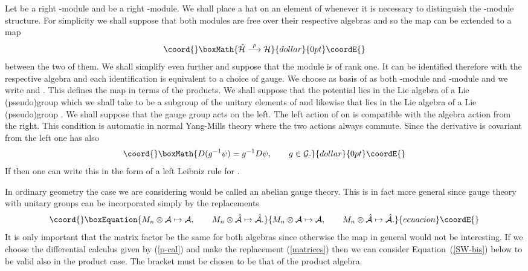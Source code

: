 \documentclass[a4paper,12pt]{article}
\def\h#1{\hat #1}
\def\c#1{{\cal #1}}
\def\wm{\mathbin{*}}
\def\hwm{\mathbin{\hat *}}
\begin{document}
Let \myHighlight{$\c{H}$}\coordHE{} be a right \myHighlight{$\c{A}$}\coordHE{}-module and \myHighlight{$\h{\c{H}}$}\coordHE{} be
a right \myHighlight{$\h{\c}{A}$}\coordHE{}-module.  We shall place a hat on an element of \myHighlight{$\c{H}$}\coordHE{}
whenever it is necessary to distinguish the \myHighlight{$\h{\c}{A}$}\coordHE{}-module structure.
For simplicity we shall suppose that both modules
are free over their respective algebras and so the map \myHighlight{$\rho$}\coordHE{} can be
extended to a map
$$\coord{}\boxMath{
\h{\c{H}} \buildrel \rho \over \longrightarrow \c{H}
}{dollar}{0pt}\coordE{}$$
between the two of them. We shall simplify even further and suppose
that the module is of rank one. It can be identified therefore with
the respective algebra and each identification is equivalent to a
choice of gauge. We choose \myHighlight{$\psi_0 \in \c{H}$}\coordHE{} as basis of \myHighlight{$\c{H}$}\coordHE{}
as both \myHighlight{$\c{A}$}\coordHE{}-module and \myHighlight{$\h{\c}{A}$}\coordHE{}-module and we write
\myHighlight{$\psi = \psi_0 \wm f$}\coordHE{} and \myHighlight{$\h{\psi} = \psi_0 \hwm f$}\coordHE{}. This defines the
map \myHighlight{$\rho$}\coordHE{} in terms of the products.  We shall suppose that the
potential \coordHE{} lies in the Lie algebra \coordHE{} of a Lie
(pseudo)group \myHighlight{$\c{G}$}\coordHE{} which we shall take to be a subgroup of the
unitary elements of \myHighlight{$\c{A}$}\coordHE{} and likewise that \myHighlight{$\h{A}$}\coordHE{} lies in the Lie
algebra \myHighlight{$\underline{\h{g}}$}\coordHE{} of a Lie (pseudo)group \myHighlight{$\h{\c}{G}$}\coordHE{}.  We
shall suppose that the gauge group acts on the left. The left action
of \myHighlight{$\c{G}$}\coordHE{} on \myHighlight{$\c{H}$}\coordHE{} is compatible with the algebra action from the
right. This condition is automatic in normal Yang-Mills theory where
the two actions always commute.  Since the derivative is covariant
from the left one has also
$$\coord{}\boxMath{
D (g^{-1} \psi) = g^{-1} D\psi, \qquad g \in \c{G}.
}{dollar}{0pt}\coordE{}$$
If \coordHE{} then one can write this in the form of a left
Leibniz rule for \coordHE{}.

In ordinary geometry the case we are considering would be called an
abelian gauge theory.  This is in fact more general since
gauge theory with unitary groups can be incorporated simply by the
replacements
\begin{equation}\coord{}\boxEquation{
M_n \otimes \c{A} \mapsto  \c{A}, \qquad
M_n \otimes \h{\c}{A} \mapsto \h{\c}{A}.                  \label{matrices}
}{
M_n \otimes \c{A} \mapsto  \c{A}, \qquad
M_n \otimes \h{\c}{A} \mapsto \h{\c}{A}.                  }{ecuacion}\coordE{}\end{equation}
It is only important that the matrix factor be the same for both
algebras since otherwise the map \myHighlight{$\rho$}\coordHE{} in general would not be
interesting.  If we choose the differential calculus given by
(\ref{p-cal}) and make the replacement (\ref{matrices}) then we can
consider Equation~(\ref{SW-bis}) below to be valid also in the product
case.  The bracket must be chosen to be that of the product algebra.
\end{document}

